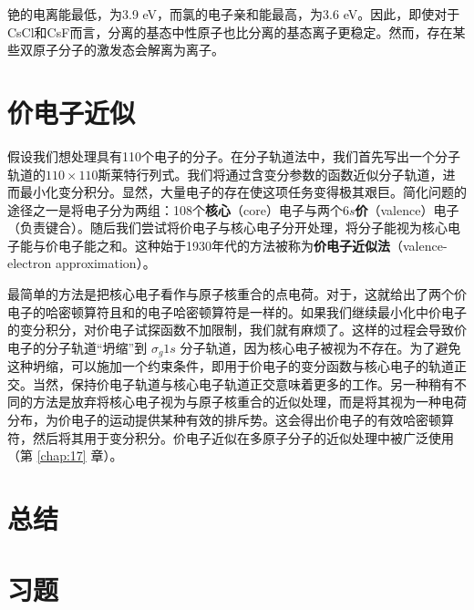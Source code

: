     铯的电离能最低，为3.9 eV，而氯的电子亲和能最高，为3.6 eV。因此，即使对于CsCl和CsF而言，分离的基态中性原子也比分离的基态离子更稳定。然而，存在某些双原子分子的激发态会解离为离子。

\section{价电子近似}
\label{sec:13.17 The Valence-Electron Approximation}

    假设我们想处理具有110个电子的分子。在分子轨道法中，我们首先写出一个分子轨道的$110\times 110$斯莱特行列式。我们将通过含变分参数的函数近似分子轨道，进而最小化变分积分。显然，大量电子的存在使这项任务变得极其艰巨。简化问题的途径之一是将电子分为两组：108个\textbf{核心}（core）电子与两个$6s$\textbf{价}（valence）电子（负责键合）。随后我们尝试将价电子与核心电子分开处理，将分子能视为核心电子能与价电子能之和。这种始于1930年代的方法被称为\textbf{价电子近似法}（valence-electron approximation）。

    最简单的方法是把核心电子看作与原子核重合的点电荷。对于，这就给出了两个价电子的哈密顿算符且和的电子哈密顿算符是一样的。如果我们继续最小化中价电子的变分积分，对价电子试探函数不加限制，我们就有麻烦了。这样的过程会导致价电子的分子轨道“坍缩”到 $\sigma_g1s$ 分子轨道，因为核心电子被视为不存在。为了避免这种坍缩，可以施加一个约束条件，即用于价电子的变分函数与核心电子的轨道正交。当然，保持价电子轨道与核心电子轨道正交意味着更多的工作。另一种稍有不同的方法是放弃将核心电子视为与原子核重合的近似处理，而是将其视为一种电荷分布，为价电子的运动提供某种有效的排斥势。这会得出价电子的有效哈密顿算符，然后将其用于变分积分。价电子近似在多原子分子的近似处理中被广泛使用（第 \ref{chap:17} 章）。

\section*{总结}

\section*{习题}